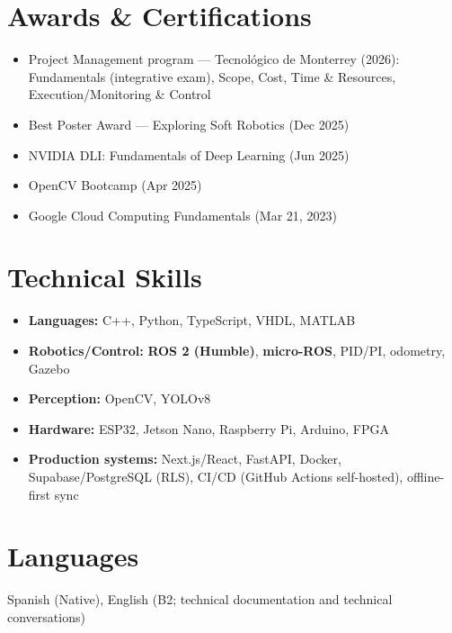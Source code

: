 \documentclass[9pt,letterpaper]{article}
\begin{document}
\section*{Awards \& Certifications}
\begin{itemize}[leftmargin=*]
  \item Project Management program — Tecnológico de Monterrey (2026): Fundamentals (integrative exam), Scope, Cost, Time \& Resources, Execution/Monitoring \& Control
  \item Best Poster Award — Exploring Soft Robotics (Dec 2025)
  \item NVIDIA DLI: Fundamentals of Deep Learning (Jun 2025)
  \item OpenCV Bootcamp (Apr 2025)
  \item Google Cloud Computing Fundamentals (Mar 21, 2023)
\end{itemize}

\section*{Technical Skills}
\begin{itemize}[leftmargin=*]
  \item \textbf{Languages:} C++, Python, TypeScript, VHDL, MATLAB
  \item \textbf{Robotics/Control:} \textbf{ROS 2 (Humble)}, \textbf{micro-ROS}, PID/PI, odometry, Gazebo
  \item \textbf{Perception:} OpenCV, YOLOv8
  \item \textbf{Hardware:} ESP32, Jetson Nano, Raspberry Pi, Arduino, FPGA
  \item \textbf{Production systems:} Next.js/React, FastAPI, Docker, Supabase/PostgreSQL (RLS), CI/CD (GitHub Actions self-hosted), offline-first sync
\end{itemize}

\section*{Languages}
Spanish (Native), English (B2; technical documentation and technical conversations)
\end{document}
